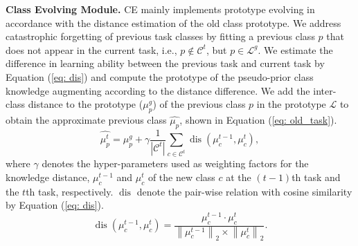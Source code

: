 \noindent\textbf{Class Evolving Module.} CE mainly implements prototype evolving in accordance with the distance estimation of the old class prototype.
We address catastrophic forgetting of previous task classes by fitting a previous class $p$ that does not appear in the current task, i.e., $p \notin \mathcal{C}^t$, but $p \in \mathcal{L}^g$.
We estimate the difference in learning ability between the previous task and current task by Equation (\ref{eq: dis}) and compute the prototype of the pseudo-prior class knowledge augmenting according to the distance difference.
We add the inter-class distance to the prototype ($\mu_{p}^g$) of the previous class $p$ in the prototype $\mathcal{L}$ to obtain the approximate previous class $\hat{\mu_{p}}$, shown in Equation (\ref{eq: old_task}).
\begin{equation} \label{eq: old_task}
   \hat{\mu_{p}^t} = \mu_{p}^g + \gamma\frac{1}{|\mathcal{C}^t|} \sum_{c \in \mathcal{C}^t} \operatorname{dis}\left(\mu_{c}^{t-1}, \mu_{c}^{t}\right),
\end{equation}
where $\gamma$ denotes the hyper-parameters used as weighting factors for the knowledge distance, $\mu_{c}^{t-1}$ and $\mu_{c}^{t}$ of the new class $c$ at the $(t-1)$th task and the $t$th task, respectively.
$\operatorname{dis}$ denote the pair-wise relation with cosine similarity by Equation (\ref{eq: dis}).
\begin{equation} \label{eq: dis}
   \operatorname{dis}\left(\mu_{c}^{t-1}, \mu_{c}^{t}\right)=\frac{\mu_{c}^{t-1} \cdot \mu_{c}^{t}}{\left\|\mu_{c}^{t-1}\right\|_{2} \times\left\|\mu_{c}^{t}\right\|_{2}}.
\end{equation}

